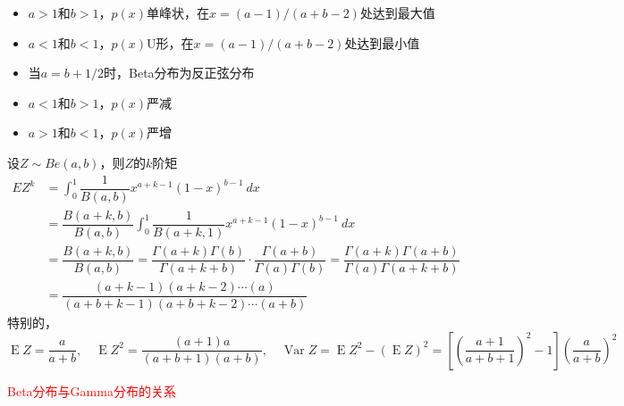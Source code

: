 \begin{itemize}
    \item $a>1$和$b>1$，$p(x)$单峰状，在$x = (a-1)/(a+b-2)$处达到最大值
    \item $a<1$和$b<1$，$p(x)$U形，在$x = (a-1)/(a+b-2)$处达到最小值
    \item 当$a = b+1/2$时，Beta分布为反正弦分布
    \item $a<1$和$b>1$，$p(x)$严减
    \item $a>1$和$b<1$，$p(x)$严增
\end{itemize}

\begin{note}
    设$Z\sim Be(a, b)$，则$Z$的$k$阶矩
    \[
        \begin{array}{ll}
            EZ^k &= \displaystyle\int_{0}^{1}\dfrac{1}{B(a,b)}x^{a+k-1}(1-x)^{b-1}\ dx\\
            &=\dfrac{B(a+k,b)}{B(a,b)}\displaystyle\int_{0}^{1}\dfrac{1}{B(a+k,1)}x^{a+k-1}(1-x)^{b-1}\ dx\\
            &= \dfrac{B(a+k,b)}{B(a,b)} = \dfrac{\Gamma(a+k)\Gamma(b)}{\Gamma(a+k+b)}\cdot \dfrac{\Gamma(a+b)}{\Gamma(a)\Gamma(b)}=\dfrac{\Gamma(a+k)\Gamma(a+b)}{\Gamma(a)\Gamma(a+k+b)}\\
            &=\dfrac{(a+k-1)(a+k-2)\cdots (a)}{(a+b+k-1)(a+b+k-2)\cdots (a+b)}
        \end{array}
    \]
    特别的，
    \[
        \operatorname{E}Z = \dfrac{a}{a+b},\quad \operatorname{E}Z^2 = \dfrac{(a+1)a}{(a+b+1)(a+b)} ,\quad  \operatorname{Var}Z = \operatorname{E}Z^2-(\operatorname{E}Z)^2=\left[ (\dfrac{a+1}{a+b+1})^2-1 \right](\dfrac{a}{a+b})^2
    \]
\end{note}

\textcolor{red}{Beta分布与Gamma分布的关系}

